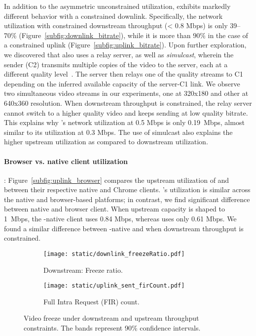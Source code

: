 In addition to the asymmetric unconstrained utilization, \meet exhibits
markedly different behavior with a constrained downlink.
Specifically, the
network utilization with constrained downstream throughput (< 0.8 Mbps) is
only 39--70\%
(Figure~\ref{subfig:downlink_bitrate}), while it is more than $90\%$ in the
case of a constrained uplink (Figure~\ref{subfig:uplink_bitrate}). Upon
further exploration, we discovered that
\meet also uses a relay server, as well as
\textit{simulcast}, wherein the sender (C2) transmits multiple copies of the
video to the server, each at a different quality
level~\cite{nistico2020comparative}. The server then relays one of the quality
streams to C1 depending on the inferred available capacity of the server-C1
link. We observe two simultaneous video streams in our experiments, one at
320x180 and other at 640x360 resolution. When downstream throughput is
constrained, the relay
server cannot switch to a higher quality video and keeps sending at low
quality bitrate. This explains why \meet's network utilization at 0.5 Mbps is
only 0.19~Mbps, almost similar to its utilization at 0.3 Mbps.  The use of
simulcast also explains the higher upstream utilization as compared to
downstream utilization. 

\paragraph{Browser vs. native client utilization}:
Figure~\ref{subfig:uplink_browser} compares the upstream utilization of \zoom
and \teams between their respective native and Chrome clients. \zoom's
utilization is similar across the native and browser-based platforms; in
contrast, we find significant difference between \teams native and browser
client. When upstream capacity is shaped to 1~Mbps, the \teams-native client
uses 0.84 Mbps, whereas \teamsbrowser uses only 0.61 Mbps. We found a
similar difference between \teams-native and \teamsbrowser when downstream
throughput is constrained. 

\begin{figure}[t]
    \centering
    \begin{subfigure}[t]{0.4\textwidth}      
        \texttt{[image: static/downlink\_freezeRatio.pdf]}
        \caption{Downstream: Freeze ratio.}
 		\label{subfig:downlink_freeze_ratio}
    \end{subfigure}
	\begin{subfigure}[t]{0.4\textwidth}   
        \centering
        \texttt{[image: static/uplink\_sent\_firCount.pdf]}
    \caption{Full Intra Request (FIR) count.}
    \label{subfig:uplink_fir}
    \end{subfigure}%
	\caption{Video freeze under downstream and upstream throughput constraints. The bands represent 90\% confidence intervals.%
	}
	\label{fig:video_freeze}
\end{figure}







